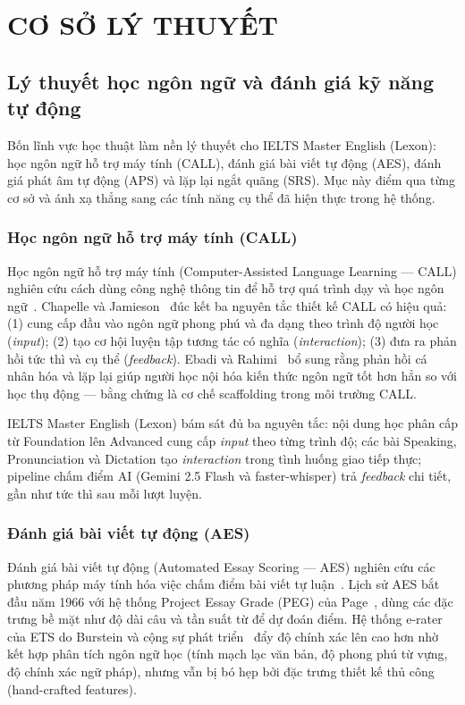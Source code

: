 \chapter{CƠ SỞ LÝ THUYẾT}
\thispagestyle{mainstyle}

\section{Lý thuyết học ngôn ngữ và đánh giá kỹ năng tự động}

Bốn lĩnh vực học thuật làm nền lý thuyết cho IELTS Master English (Lexon): học ngôn ngữ hỗ trợ máy tính (CALL), đánh giá bài viết tự động (AES), đánh giá phát âm tự động (APS) và lặp lại ngắt quãng (SRS). Mục này điểm qua từng cơ sở và ánh xạ thẳng sang các tính năng cụ thể đã hiện thực trong hệ thống.

\subsection{Học ngôn ngữ hỗ trợ máy tính (CALL)}

Học ngôn ngữ hỗ trợ máy tính (Computer-Assisted Language Learning --- CALL) nghiên cứu cách dùng công nghệ thông tin để hỗ trợ quá trình dạy và học ngôn ngữ~\cite{warschauer1998computers}. Chapelle và Jamieson~\cite{chapelle2008tips} đúc kết ba nguyên tắc thiết kế CALL có hiệu quả: (1) cung cấp đầu vào ngôn ngữ phong phú và đa dạng theo trình độ người học (\textit{input}); (2) tạo cơ hội luyện tập tương tác có nghĩa (\textit{interaction}); (3) đưa ra phản hồi tức thì và cụ thể (\textit{feedback}). Ebadi và Rahimi~\cite{ebadi2018scaffolding} bổ sung rằng phản hồi cá nhân hóa và lặp lại giúp người học nội hóa kiến thức ngôn ngữ tốt hơn hẳn so với học thụ động --- bằng chứng là cơ chế scaffolding trong môi trường CALL.

IELTS Master English (Lexon) bám sát đủ ba nguyên tắc: nội dung học phân cấp từ Foundation lên Advanced cung cấp \textit{input} theo từng trình độ; các bài Speaking, Pronunciation và Dictation tạo \textit{interaction} trong tình huống giao tiếp thực; pipeline chấm điểm AI (Gemini 2.5 Flash và faster-whisper) trả \textit{feedback} chi tiết, gần như tức thì sau mỗi lượt luyện.

\subsection{Đánh giá bài viết tự động (AES)}

Đánh giá bài viết tự động (Automated Essay Scoring --- AES) nghiên cứu các phương pháp máy tính hóa việc chấm điểm bài viết tự luận~\cite{hyland2019writing}. Lịch sử AES bắt đầu năm 1966 với hệ thống Project Essay Grade (PEG) của Page~\cite{page1966imminence}, dùng các đặc trưng bề mặt như độ dài câu và tần suất từ để dự đoán điểm. Hệ thống e-rater của ETS do Burstein và cộng sự phát triển~\cite{burstein2003criterion} đẩy độ chính xác lên cao hơn nhờ kết hợp phân tích ngôn ngữ học (tính mạch lạc văn bản, độ phong phú từ vựng, độ chính xác ngữ pháp), nhưng vẫn bị bó hẹp bởi đặc trưng thiết kế thủ công (hand-crafted features).

